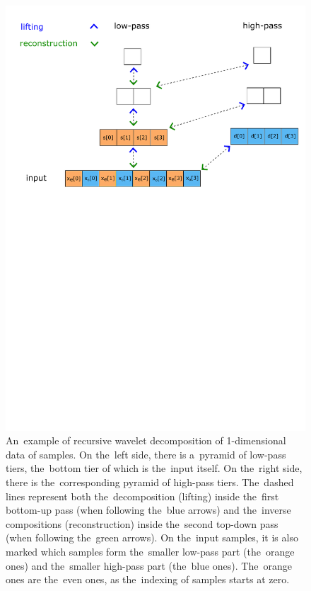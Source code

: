 \begin{figure}
	\includegraphics[trim={1cm 16cm 0 0}, clip, width=\textwidth]{figures/wavelet_1d_pyramid.pdf}\centering
	\caption{An~example of recursive wavelet decomposition of 1-dimensional data of samples. On the~left side, there is a~pyramid of low-pass tiers, the~bottom tier of which is the~input itself. On the~right side, there is the~corresponding pyramid of high-pass tiers. The~dashed lines represent both the~decomposition (lifting) inside the~first bottom-up pass (when following the~blue arrows) and the~inverse compositions (reconstruction) inside the~second top-down pass (when following the~green arrows). On the~input samples, it is also marked which samples form the~smaller low-pass part (the~orange ones) and the~smaller high-pass part (the~blue ones). The~orange ones are the~even ones, as the~indexing of samples starts at zero.}
	\label{fig:wavelet_1d_pyramid}
\end{figure}

